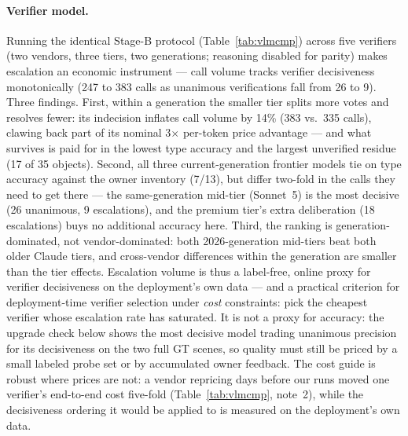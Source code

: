 \paragraph{Verifier model.}
Running the identical Stage-B protocol (Table~\ref{tab:vlmcmp}) across
five verifiers (two vendors, three tiers, two generations; reasoning
disabled for parity) makes escalation an economic instrument --- call
volume tracks verifier decisiveness monotonically (247 to 383 calls as
unanimous verifications fall from 26 to 9). Three findings. First,
within a generation the smaller tier splits more votes and resolves
fewer: its indecision inflates call volume by 14\% (383 vs.\ 335
calls), clawing back part of its nominal 3$\times$ per-token price
advantage --- and what survives is paid for in the lowest type
accuracy and the largest unverified residue (17 of 35 objects).
Second, all three current-generation
frontier models tie on type accuracy against the owner inventory
(7/13), but differ two-fold in the calls they need to get there ---
the same-generation mid-tier (Sonnet~5) is the most decisive (26
unanimous, 9 escalations), and the premium tier's extra deliberation
(18 escalations) buys no additional accuracy here. Third, the ranking
is generation-dominated, not vendor-dominated: both 2026-generation
mid-tiers beat both older Claude tiers, and cross-vendor differences
within the generation are smaller than the tier effects. Escalation
volume is thus a label-free, online proxy for verifier decisiveness on
the deployment's own data --- and a practical criterion for
deployment-time verifier selection under \emph{cost} constraints:
pick the cheapest verifier whose escalation rate has saturated. It is
not a proxy for accuracy: the upgrade check below shows the most
decisive model trading
unanimous precision for its decisiveness on the two full GT scenes, so
quality must still be priced by a small labeled probe set or by
accumulated owner feedback. The cost guide is robust where prices are
not: a vendor repricing days before our runs moved one verifier's
end-to-end cost five-fold (Table~\ref{tab:vlmcmp}, note~2), while the
decisiveness ordering it would be applied to is measured on the
deployment's own data.

